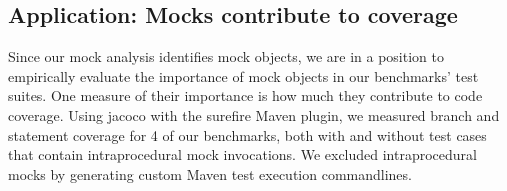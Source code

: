 %
%

\subsection{Application: Mocks contribute to coverage} Since our mock analysis identifies mock objects, we are in a position to empirically evaluate the importance of mock objects in our benchmarks' test suites. One measure of their importance is how much they contribute to code coverage. Using jacoco with the surefire Maven plugin, we measured branch and statement coverage for 4 of our benchmarks, both with and without test cases that contain intraprocedural mock invocations. We excluded intraprocedural mocks by generating custom Maven test execution commandlines.

